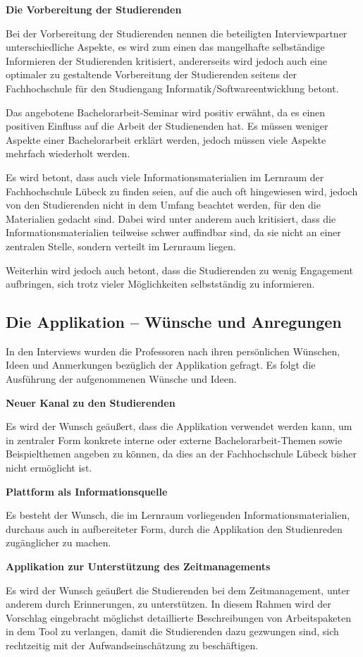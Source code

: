 \documentclass[bibliography=totoc,listof=totoc,BCOR=5mm,DIV=12,oneside]{scrbook}
\begin{document}
\newpage
\par \bigskip \textbf{Die Vorbereitung der Studierenden}
\par Bei der Vorbereitung der Studierenden nennen die beteiligten Interviewpartner unterschiedliche Aspekte, es wird zum einen das mangelhafte selbständige Informieren der Studierenden kritisiert, andererseits wird jedoch auch eine optimaler zu gestaltende Vorbereitung der Studierenden seitens der Fachhochschule für den Studiengang Informatik/Softwareentwicklung betont.
\par \medskip Das angebotene Bachelorarbeit-Seminar wird positiv erwähnt, da es einen positiven Einfluss auf die Arbeit der Studienenden hat. Es müssen weniger Aspekte einer Bachelorarbeit erklärt werden, jedoch müssen viele Aspekte mehrfach wiederholt werden. 
\par Es wird betont, dass auch viele Informationsmaterialien im Lernraum der Fachhochschule Lübeck zu finden seien, auf die auch oft hingewiesen wird, jedoch von den Studierenden nicht in dem Umfang beachtet werden, für den die Materialien gedacht sind. Dabei wird unter anderem auch kritisiert, dass die Informationsmaterialien teilweise schwer auffindbar sind, da sie nicht an einer zentralen Stelle, sondern verteilt im Lernraum liegen. 
\par Weiterhin wird jedoch auch betont, dass die Studierenden zu wenig Engagement aufbringen, sich trotz vieler Möglichkeiten selbstständig zu informieren. 

\subsection{Die Applikation – Wünsche und Anregungen}
\par In den Interviews wurden die Professoren nach ihren persönlichen Wünschen, Ideen und Anmerkungen bezüglich der Applikation gefragt. Es folgt die Ausführung der aufgenommenen Wünsche und Ideen.

\par \bigskip \textbf{Neuer Kanal zu den Studierenden}
\par Es wird der Wunsch geäußert, dass die Applikation verwendet werden kann, um in zentraler Form konkrete interne oder externe Bachelorarbeit-Themen sowie Beispielthemen angeben zu können, da dies an der Fachhochschule Lübeck bisher nicht ermöglicht ist.
\par \bigskip \textbf{Plattform als Informationsquelle}
\par Es besteht der Wunsch, die im Lernraum vorliegenden Informationsmaterialien, durchaus auch in aufbereiteter Form, durch die Applikation den Studienreden zugänglicher zu machen.
\par \bigskip \textbf{Applikation zur Unterstützung des Zeitmanagements}
\par Es wird der Wunsch geäußert die Studierenden bei dem Zeitmanagement, unter anderem durch Erinnerungen, zu unterstützen. In diesem Rahmen wird der Vorschlag eingebracht möglichst detaillierte Beschreibungen von Arbeitspaketen in dem Tool zu verlangen, damit die Studierenden dazu gezwungen sind, sich rechtzeitig mit der Aufwandseinschätzung zu beschäftigen.
\end{document}
